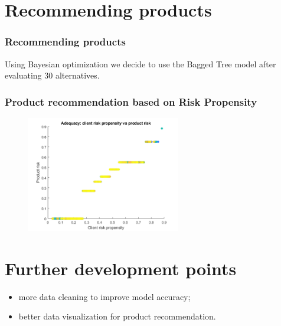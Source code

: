 \documentclass{beamer}
\begin{document}

\section{Recommending products}

\begin{frame}
\frametitle{Recommending products}
Using Bayesian optimization we decide to use the Bagged Tree model after evaluating 30 alternatives.
\end{frame}

\begin{frame}
    \frametitle{Product recommendation based on Risk Propensity}
    \begin{figure}
    	\centering
    	\includegraphics[width=0.6\textwidth]{recomm1}
    \end{figure}
\end{frame}

\section{Further development points}

\begin{frame}
    \begin{itemize}
        \item more data cleaning to improve model accuracy;
        \item better data visualization for product recommendation.
    \end{itemize}
\end{frame}
\end{document}
